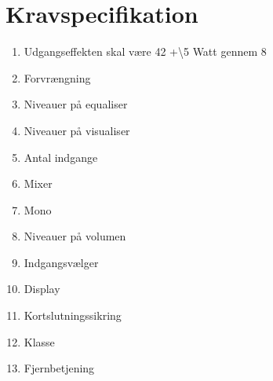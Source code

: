 \chapter{Kravspecifikation}

\begin{enumerate}
\item Udgangseffekten skal være 42 +\backslash 5 Watt gennem 8\Omega
\item Forvrængning
\item Niveauer på equaliser
\item Niveauer på visualiser
\item Antal indgange
\item Mixer
\item Mono
\item Niveauer på volumen
\item Indgangsvælger
\item Display
\item Kortslutningssikring
\item Klasse
\item Fjernbetjening
\end{enumerate}